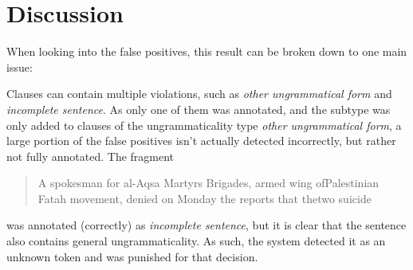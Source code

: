\documentclass[a4paper,10pt]{scrartcl}
\begin{document}
\section{Discussion}

When looking into the false positives, this result can be broken down to one main issue:

Clauses can contain multiple violations, such as \textit{other ungrammatical form} and \textit{incomplete sentence}. As only one of them was annotated, and the subtype was only added to clauses of the ungrammaticality type \textit{other ungrammatical form}, a large portion of the false positives isn't actually detected incorrectly, but rather not fully annotated. The fragment

\begin{quote}
	A spokesman for al-Aqsa Martyrs Brigades, armed wing ofPalestinian\\
	Fatah movement, denied on Monday the reports that thetwo suicide
\end{quote}

was annotated (correctly) as \textit{incomplete sentence}, but it is clear that the sentence also contains general ungrammaticality. As such, the system detected it as an unknown token and was punished for that decision.
\newpage


\end{document}
